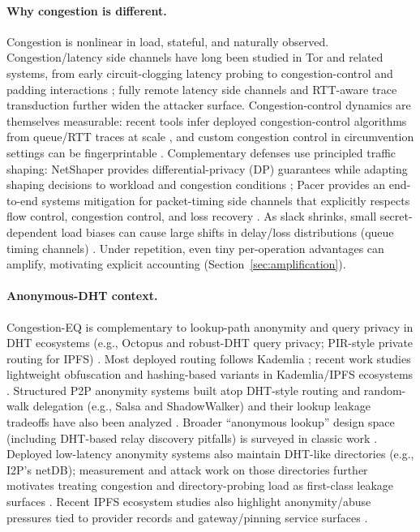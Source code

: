 \documentclass[11pt]{article}
\theoremstyle{definition}
\theoremstyle{remark}
\begin{document}
\paragraph{Why congestion is different.}
Congestion is nonlinear in load, stateful, and naturally observed.
Congestion/latency side channels have long been studied in Tor and related systems, from early circuit-clogging latency probing \cite{murdoch_danezis2005,latencyleak,congestion_longpaths} to congestion-control and padding interactions \cite{defenestrator,tor324}; fully remote latency side channels \cite{snailload,zeroclicksnailload} and RTT-aware trace transduction \cite{cellshift2026} further widen the attacker surface.
Congestion-control dynamics are themselves measurable: recent tools infer deployed congestion-control algorithms from queue/RTT traces at scale \cite{nebby2024,ccanalyzer2024}, and custom congestion control in circumvention settings can be fingerprintable \cite{customcc_foci2025}.
Complementary defenses use principled traffic shaping: NetShaper provides differential-privacy (DP) guarantees while adapting shaping decisions to workload and congestion conditions \cite{netshaper2024}; Pacer provides an end-to-end systems mitigation for packet-timing side channels that explicitly respects flow control, congestion control, and loss recovery \cite{pacer2022}. 
As slack shrinks, small secret-dependent load biases can cause large shifts in delay/loss distributions (queue timing channels) \cite{bitsqueues,gong2014timing,beams2021}.
Under repetition, even tiny per-operation advantages can amplify, motivating explicit accounting (Section~\ref{sec:amplification}).

\paragraph{Anonymous-DHT context.}
Congestion-EQ is complementary to lookup-path anonymity and query privacy in DHT ecosystems (e.g., Octopus and robust-DHT query privacy; PIR-style private routing for IPFS) \cite{octopus,add_query_privacy,peer2pir}.
Most deployed routing follows Kademlia \cite{kademlia}; recent work studies lightweight obfuscation and hashing-based variants in Kademlia/IPFS ecosystems \cite{kademlia_obfuscation,ipfs_triplehash,bitswap_randomwalks}.
Structured P2P anonymity systems built atop DHT-style routing and random-walk delegation (e.g., Salsa and ShadowWalker) and their lookup leakage tradeoffs have also been analyzed \cite{salsa,shadowwalker,mittal_infoleaks2012}.
Broader ``anonymous lookup'' design space (including DHT-based relay discovery pitfalls) is surveyed in classic work \cite{morselli2006_lookup,wang_mittal_borisov2010_lookup}.
Deployed low-latency anonymity systems also maintain DHT-like directories (e.g., I2P's netDB); measurement and attack work on those directories further motivates treating congestion and directory-probing load as first-class leakage surfaces \cite{egger_i2p2013,timpanaro_netdb2015}.
Recent IPFS ecosystem studies also highlight anonymity/abuse pressures tied to provider records and gateway/pinning service surfaces \cite{ipfs_abuse2025}.
\end{document}
